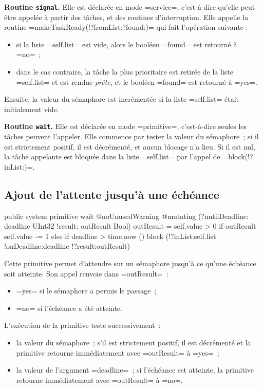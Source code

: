 {\bf Routine \texttt{signal}.} Elle est déclarée en mode \omnibus=service=, c'est-à-dire qu'elle peut être appelée à partir des tâches, et des routines d'interruption. Elle appelle la routine \omnibus=makeTaskReady(!?fromList:?found:)= qui fait l'opération suivante :
\begin{itemize}
  \item si la liste \omnibus=self.list= est vide, alors le booléen \omnibus=found= est retourné à \omnibus=no=~;
  \item dans le cas contraire, la tâche la plus prioritaire est retirée de la liste \omnibus=self.list= et est rendue \emph{prête}, et le booléen \omnibus=found= est retourné à \omnibus=yes=.
\end{itemize}

Ensuite, la valeur du sémaphore est incrémentée si la liste \omnibus=self.list= était initialement vide.


{\bf Routine \texttt{wait}.} Elle est déclarée en mode \omnibus=primitive=, c'est-à-dire seules les tâches peuvent l'appeler. Elle commence par tester la valeur du sémaphore~; si il est strictement positif, il est décrémenté, et aucun blocage n'a lieu. Si il est nul, la tâche appelante est bloquée dans la liste \omnibus=self.list= par l'appel de \omnibus=block(!?inList:)=.


\subsection{Ajout de l'attente jusqu'à une échéance}

\begin{OMNIBUS}
public system primitive wait
@noUnusedWarning @mutating (?untilDeadline: deadline UInt32
                            !result: outResult Bool) {
  outResult = self.value > 0
  if outResult {
    self.value -= 1
  }else if deadline > time.now () {
    block (!?inList:self.list !onDeadline:deadline !?result:outResult)
  }
}
\end{OMNIBUS}

Cette primitive permet d'attendre sur un sémaphore jusqu'à ce qu'une échéance soit atteinte. Son appel renvoie dans \omnibus=outResult=~:
\begin{itemize}
  \item \omnibus=yes= si le sémaphore a permis le passage~;
  \item \omnibus=no= si l'échéance a été atteinte.
\end{itemize}

L'exécution de la primitive teste successivement~:
\begin{itemize}
  \item la valeur du sémaphore~; s'il est strictement positif, il est décrémenté et la primitive retourne immédiatement avec \omnibus=outResult= à \omnibus=yes=~;
  \item la valeur de l'argument \omnibus=deadline=~; si l'échéance est atteinte, la primitive retourne immédiatement avec \omnibus=outResult= à \omnibus=no=.
\end{itemize}

